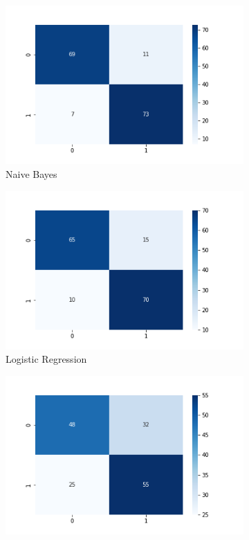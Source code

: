 \documentclass[a4paper, 11pt]{article}
\begin{document}
\begin{figure}
    \centering
    \begin{subfigure}[t]{0.45\textwidth}
        \centering
        \includegraphics[width=\textwidth]{figures/MultinomialNB.png}
        \caption{Naive Bayes}\label{nb cm}
    \end{subfigure}
    \begin{subfigure}[t]{0.45\textwidth}
        \centering
        \includegraphics[width=\textwidth]{figures/LogisticRegression.png}
        \caption{Logistic Regression}\label{lr cm}
    \end{subfigure}
        \begin{subfigure}[t]{0.45\textwidth}
        \centering
        \includegraphics[width=\textwidth]{figures/ClassificationTree.png}

\end{subfigure}
\end{figure}
\end{document}
